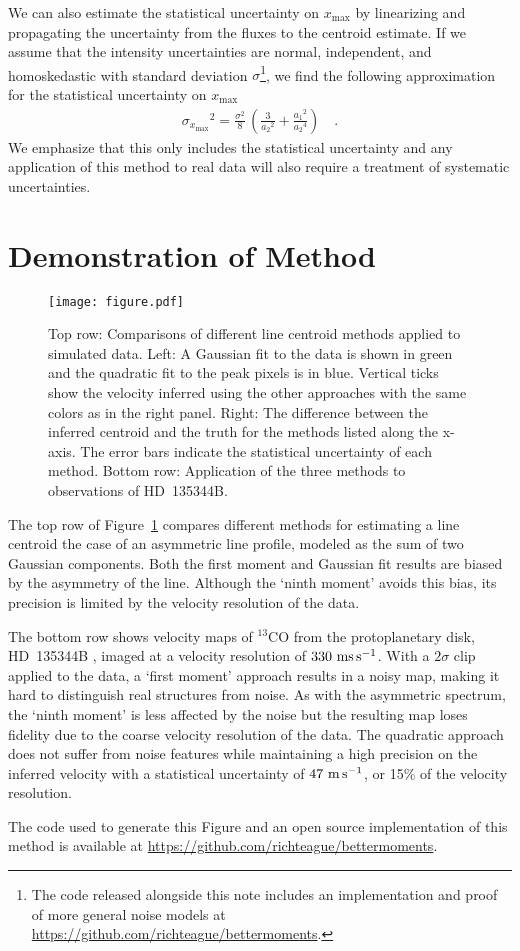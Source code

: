 \documentclass[rnaas]{aastex62}
\begin{document}
We can also estimate the statistical uncertainty on $x_\mathrm{max}$ by
linearizing and propagating the uncertainty from the fluxes to the centroid
estimate.
If we assume that the intensity uncertainties are normal, independent, and
homoskedastic with standard deviation $\sigma$\footnote{The code released
alongside this note includes an implementation and proof of more general noise
models at \url{https://github.com/richteague/bettermoments}.}, we find the
following approximation for the statistical uncertainty on $x_\mathrm{max}$
\begin{eqnarray}
{\sigma_{x_\mathrm{max}}}^2 = \frac{\sigma^2}{8}\,\left(
    \frac{3}{{a_2}^2} + \frac{{a_1}^2}{{a_2}^4}
\right)\quad.
\end{eqnarray}
We emphasize that this only includes the statistical uncertainty and any
application of this method to real data will also require a treatment of
systematic uncertainties.

\section{Demonstration of Method}

\begin{figure}[htbp]
\centering
\texttt{[image: figure.pdf]}
\caption{%
Top row: Comparisons of different line centroid methods applied to simulated
data.
Left: A Gaussian fit to the data is shown in green and the quadratic fit to
the peak pixels is in blue.
Vertical ticks show the velocity inferred using the other approaches with the
same colors as in the right panel.
Right: The difference between the inferred centroid and the truth for the
methods listed along the x-axis.
The error bars indicate the statistical uncertainty of each method.
Bottom row: Application of the three methods to observations of HD~135344B.
\label{figure}}
\end{figure}

The top row of Figure~\ref{figure} compares different methods for estimating
a line centroid the case of an asymmetric line profile, modeled as the sum of
two Gaussian components.
Both the first moment and Gaussian fit results are biased by the asymmetry of
the line.
Although the `ninth moment' avoids this bias, its precision is limited by the
velocity resolution of the data.

The bottom row shows velocity maps of $^{13}$CO from the protoplanetary disk,
HD~135344B \citep[ALMA Project 2012.1.00158.S]{vanderMarel:2016}, imaged at a
velocity resolution of $330~{\rm ms\,s^{-1}}$.
With a $2\sigma$ clip applied to the data, a `first moment' approach results
in a noisy map, making it hard to distinguish real structures from noise.
As with the asymmetric spectrum, the `ninth moment' is less affected by the
noise but the resulting map loses fidelity due to the coarse velocity
resolution of the data.
The quadratic approach does not suffer from noise features while maintaining a
high precision on the inferred velocity with a statistical uncertainty of
$47~{\rm m\,s^{-1}}$, or 15\% of the velocity resolution.

The code used to generate this Figure and an open source implementation of
this method is available at
\url{https://github.com/richteague/bettermoments}.


\end{document}
